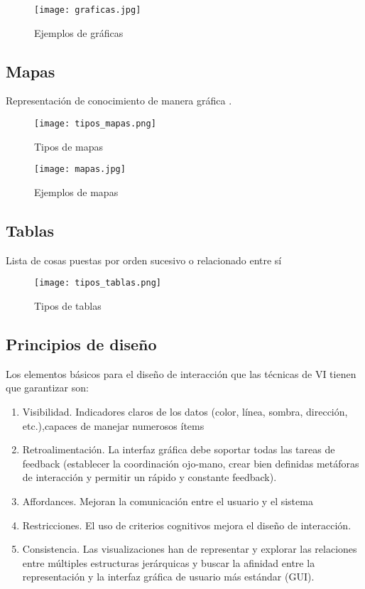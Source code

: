 \begin{figure}[H]
\centering
\texttt{[image: graficas.jpg]}
\caption{Ejemplos de gráficas}
\label{fig:ejemplo}
\end{figure}

\subsection{Mapas}
Representación de conocimiento de manera gráfica \cite{arenas}.
\begin{figure}[H]
\centering
\texttt{[image: tipos\_mapas.png]}
\caption{Tipos de mapas}
\label{fig:tipos}
\end{figure}

\begin{figure}[H]
\centering
\texttt{[image: mapas.jpg]}
\caption{Ejemplos de mapas}
\label{fig:ejemplo}
\end{figure}

\subsection{Tablas}
Lista de cosas puestas por orden sucesivo o relacionado entre sí
\begin{figure}[H]
\centering
\texttt{[image: tipos\_tablas.png]}
\caption{Tipos de tablas}
\label{fig:tipo}
\end{figure}

\subsection{Principios de diseño}
Los elementos básicos para el diseño de interacción que las técnicas de VI tienen que garantizar son: \\
\begin{enumerate}
\item Visibilidad. Indicadores claros de los datos (color, línea, sombra, dirección, etc.),capaces de manejar numerosos ítems 
\item Retroalimentación. La interfaz gráfica debe soportar todas las tareas de feedback (establecer la coordinación ojo-mano, crear bien definidas metáforas de interacción y permitir un rápido y constante feedback). 
\item Affordances. Mejoran la comunicación entre el usuario y el sistema 
\item Restricciones. El uso de criterios cognitivos mejora el diseño de interacción.
\item Consistencia. Las visualizaciones han de representar y explorar las relaciones entre múltiples estructuras jerárquicas y buscar la afinidad entre la representación y la interfaz gráfica de usuario más estándar (GUI)\cite{arjona}.
\end{enumerate}


